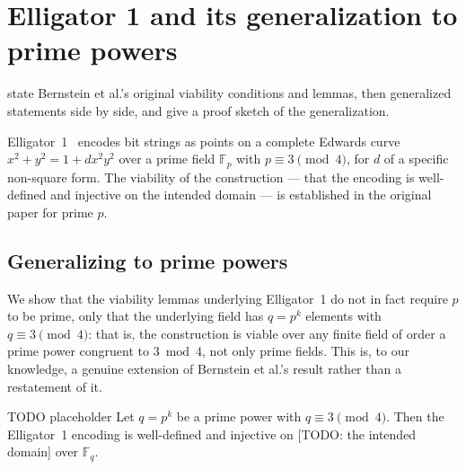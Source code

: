 \section{Elligator 1 and its generalization to prime powers}
\label{sec:elligator1}

state Bernstein et al.'s original viability conditions
and lemmas, then generalized statements side by side, and give
a proof sketch of the generalization.

Elligator~1~\cite[\S3]{bernstein2013a} encodes bit strings as
points on a complete Edwards curve $x^2 + y^2 = 1 + dx^2y^2$ over a
prime field $\mathbb{F}_p$ with $p \equiv 3 \pmod 4$, for $d$ of a
specific non-square form. The viability of the construction --- that
the encoding is well-defined and injective on the intended domain ---
is established in the original paper for prime $p$.

\subsection{Generalizing to prime powers}
\label{subsec:prime-power-generalization}

We show that the viability lemmas underlying Elligator~1 do not in
fact require $p$ to be prime, only that the underlying field has
$q = p^k$ elements with $q \equiv 3 \pmod 4$: that is, the
construction is viable over any finite field of order a prime power
congruent to $3 \bmod 4$, not only prime fields. This is, to our
knowledge, a genuine extension of Bernstein et al.'s result rather
than a restatement of it.

\begin{theorem}
\label{thm:elligator1-prime-power}
TODO placeholder
Let $q = p^k$ be a prime power with $q \equiv 3 \pmod 4$. Then the
Elligator~1 encoding is well-defined and injective on
[TODO: the intended domain] over $\mathbb{F}_q$.
\end{theorem}

